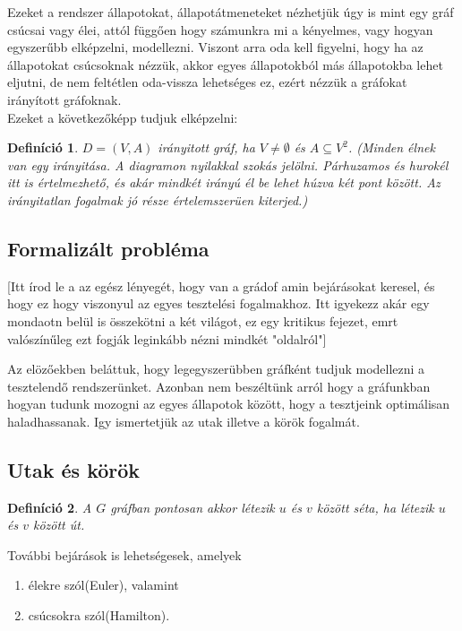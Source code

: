 \documentclass[12pt]{article}
\newtheorem{defin}{Definíció}[section]
\begin{document}
Ezeket a rendszer állapotokat, állapotátmeneteket nézhetjük úgy is mint egy gráf csúcsai vagy élei, attól függően hogy számunkra mi a kényelmes, vagy hogyan egyszerűbb elképzelni, modellezni.
Viszont arra oda kell figyelni, hogy ha az állapotokat csúcsoknak nézzük, akkor egyes állapotokból más állapotokba lehet eljutni, de nem feltétlen oda-vissza lehetséges ez, ezért nézzük a gráfokat irányított gráfoknak.\\
Ezeket a következőképp tudjuk elképzelni:

\begin{defin}
$D = (V,A)$ irányitott gráf, ha $V \neq \emptyset$ és $A \subseteq V^2$. (Minden élnek van egy irányitása. A diagramon nyilakkal szokás jelölni. Párhuzamos és hurokél itt is értelmezhető, és akár mindkét irányú él be lehet húzva két pont között. Az irányitatlan fogalmak jó része értelemszerüen kiterjed.) ~\cite{szam:Fleiner}
\end{defin}

\subsection{Formalizált probléma}
[Itt írod le a az egész lényegét, hogy van a grádof amin bejárásokat keresel, és hogy ez hogy viszonyul az egyes tesztelési fogalmakhoz. Itt igyekezz akár egy mondaotn belül is összekötni a két világot, ez egy kritikus fejezet, emrt valószínűleg ezt fogják leginkább nézni mindkét "oldalról"]

Az elözőekben beláttuk, hogy legegyszerübben gráfként tudjuk modellezni a tesztelendő rendszerünket. Azonban nem beszéltünk arról hogy a gráfunkban hogyan tudunk mozogni az egyes állapotok között, hogy a tesztjeink optimálisan haladhassanak. Igy ismertetjük az utak illetve a körök fogalmát.\\

\subsection{Utak és körök}

\begin{defin}
A $G$ gráfban pontosan akkor létezik $u$ és $v$ között séta, ha létezik $u$ és $v$ között út. ~\cite{szam:Fleiner}
\end{defin}

További bejárások is lehetségesek, amelyek
\begin{enumerate}
\item élekre szól(Euler), valamint 
\item csúcsokra szól(Hamilton).
\end{enumerate}
\end{document}
